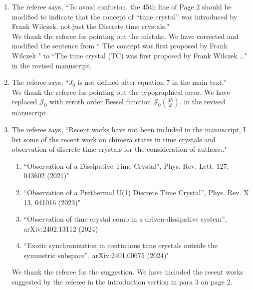 \documentclass[aps,prb,reprint,showpacs,floatfix,superscriptaddress, onecolumn, nofootinbib, 10pt]{revtex4-2}
\newcommand{\response}[1]{{\color{black}#1}} %
\newcommand{\comment}[1]{{\color{blue}#1}} %
\begin{document}
\begin{enumerate}
\begin{enumerate}
		\item The referee says, \comment{``To avoid confusion, the 45th line of Page 2 should be modified to indicate that the concept of “time crystal” was introduced by Frank Wilczek, not just the Discrete time crystals."}\\
		
		\response{We thank the referee for pointing out the mistake. We have corrected and modified the sentence from `` The concept was
		first proposed by Frank Wilczek " to ``The time crystal (TC) was first proposed by Frank Wilczek \dots" in the revised manuscript.}
	
		\item The referee says, \comment{``$J_0$ is not defined after equation 7 in the main text."}\\
		
		\response{We thank the referee for pointing out the typographical error. We have replaced $\mathcal{J}_0$ with zeroth order Bessel function $\mathcal{J}_0\left(\frac{4h}{\omega}\right)$. in the revised manuscript.}
		
		\item The referee says, \comment{``Recent works have not been included in the manuscript, I list some of the recent work on chimera states in time crystals and observation of discrete-time crystals for the consideration of authors:."}
		\begin{enumerate}
			\item \comment{``Observation of a Dissipative Time Crystal”, Phys. Rev. Lett. 127, 043602 (2021)"}
			\item \comment{``Observation of a Prethermal U(1) Discrete Time Crystal”, Phys. Rev. X 13, 041016 (2023)"}
			\item \comment{``Observation of time crystal comb in a driven-dissipative system”, arXiv:2402.13112 (2024)}
			\item \comment{``Exotic synchronization in continuous time crystals outside the symmetric subspace”, arXiv:2401.00675 (2024)"}\\
		\end{enumerate}
		
		\response{
		We thank the referee for the suggestion. We have included the recent works suggested by the referee in the introduction section in para 3 on page 2. 
		}\\
	\end{enumerate}
\end{enumerate}
\end{document}
